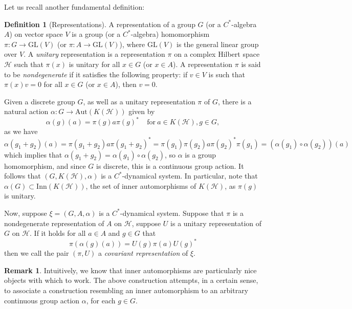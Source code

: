 \documentclass[aps,pra,showpacs,notitlepage,onecolumn,superscriptaddress,nofootinbib]{revtex4-1}
\theoremstyle{definition}
\newtheorem{definition}{Definition}[section]
\newtheorem{remark}{Remark}[section]
\begin{document}
Let us recall another fundamental definition:

\begin{definition}[Representations]
  A representation of a group $G$ (or a $C^{*}$-algebra $A$) on vector space $V$ is a group (or a $C^{*}$-algebra) homomorphism $\pi : G \rightarrow \text{GL}(V)$ (or $\pi : A \rightarrow \text{GL}(V)$), where $\text{GL}(V)$ is the general linear group over $V$.
  A \emph{unitary} representation is a representation $\pi$ on a complex Hilbert space $\mathcal{H}$ such that $\pi(x)$ is unitary for all $x \in G$ (or $x \in A$). A representation $\pi$ is said to be
  \emph{nondegenerate} if it satisfies the following property: if $v \in V$ is such that $\pi(x) v = 0$ for all $x \in G$ (or $x \in A$), then $v = 0$.
\end{definition}

\noindent Given a discrete group $G$, as well as a unitary representation $\pi$ of $G$, there is a natural action $\alpha : G \rightarrow \text{Aut}(K(\mathcal{H}))$ given
by
\begin{equation}
  \alpha(g)(a) = \pi(g) a \pi(g)^{*} \ \ \ \ \ \text{for} \ a \in K(\mathcal{H}), g \in G,
\end{equation}
as we have
\begin{equation}
  \alpha(g_1 + g_2)(a) = \pi(g_1 + g_2) a \pi(g_1 + g_2)^{*} = \pi(g_1) \pi(g_2) a \pi(g_2)^{*} \pi(g_1) = (\alpha(g_1) \circ \alpha(g_2))(a)
\end{equation}
which implies that $\alpha(g_1 + g_2) = \alpha(g_1) \circ \alpha(g_2)$, so $\alpha$ is a group homomorphism, and since $G$ is discrete, this is a continuous group action. It follows that $(G, K(\mathcal{H}), \alpha)$
is a $C^{*}$-dynamical system. In particular, note that $\alpha(G) \subset \text{Inn}(K(\mathcal{H}))$, the set of inner automorphisms of $K(\mathcal{H})$, as $\pi(g)$ is unitary.

Now, suppose $\xi = (G, A, \alpha)$ is a $C^{*}$-dynamical system. Suppose that $\pi$ is a nondegenerate representation of $A$ on $\mathcal{H}$, suppose $U$ is a unitary representation of $G$ on $\mathcal{H}$.
If it holds for all $a \in A$ and $g \in G$ that
\begin{equation}
  \pi(\alpha(g)(a)) = U(g) \pi(a) U(g)^{*}
\end{equation}
then we call the pair $(\pi, U)$ a \emph{covariant representation} of $\xi$.

\begin{remark}
  Intuitively, we know that inner automorphisms are particularly nice objects with which to work. The above construction attempts, in a certain sense, to associate a construction resembling an
  inner automorphism to an arbitrary continuous group action $\alpha$, for each $g \in G$.
  \end{remark}
\end{document}
